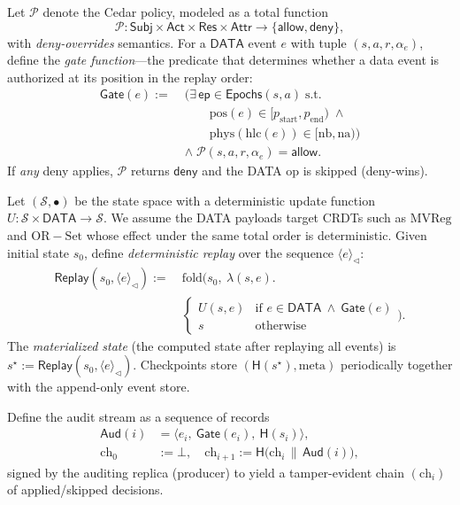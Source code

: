 \documentclass[10pt,journal,compsoc]{IEEEtran}
\begin{document}
Let $\mathcal{P}$ denote the Cedar policy, modeled as a total function
\[
  \mathcal{P} : \mathsf{Subj}\times\mathsf{Act}\times\mathsf{Res}\times\mathsf{Attr}\to\{\mathsf{allow},\mathsf{deny}\},
\]
with \emph{deny-overrides} semantics.
For a $\mathsf{DATA}$ event $e$ with tuple $(s,a,r,\alpha_e)$, define the \emph{gate function}---the predicate that determines whether a data event is authorized at its position in the replay order:
\[
\begin{aligned}
\mathsf{Gate}(e) :=\;&
\Big(
    \exists\, \mathsf{ep} \in \mathsf{Epochs}(s,a)
    \;\text{s.t.}\; \\
&\qquad
    \mathrm{pos}(e) \in [p_{\mathrm{start}}, p_{\mathrm{end}})
    \;\wedge \\
&\qquad
    \mathrm{phys}(\mathrm{hlc}(e))
    \in [\mathrm{nb}, \mathrm{na})
\Big) \\
&\wedge\;
\mathcal{P}(s,a,r,\alpha_e) = \mathsf{allow}.
\end{aligned}
\]
If \emph{any} deny applies, $\mathcal{P}$ returns $\mathsf{deny}$ and the DATA op is skipped (deny-wins).



Let $(\mathcal{S},\bullet)$ be the state space with a deterministic update function
$U:\mathcal{S}\times\mathsf{DATA}\to\mathcal{S}$.
We assume the DATA payloads target CRDTs such as $\mathrm{MVReg}$ and $\mathrm{OR\!-\!Set}$ whose effect under the same total order is deterministic.
Given initial state $s_0$, define \emph{deterministic replay} over the sequence $\langle e\rangle_{\triangleleft}$:
\[
\begin{aligned}
\mathsf{Replay}(s_0, \langle e\rangle_{\triangleleft}) :=\ &
\mathrm{fold}\Big(s_0,\ \lambda(s,e).\\
& \begin{cases}
  U(s,e) & \text{if } e\in\mathsf{DATA}\ \land\ \mathsf{Gate}(e)\\
  s      & \text{otherwise}
  \end{cases}\Big).
\end{aligned}
\]
The \emph{materialized state} (the computed state after replaying all events) is $s^\star := \mathsf{Replay}(s_0,\langle e\rangle_{\triangleleft})$.
Checkpoints store $(\mathsf{H}(s^\star),\mathrm{meta})$ periodically together with the append-only event store.


Define the audit stream as a sequence of records
\[
\begin{aligned}
\mathsf{Aud}(i) &= \big\langle e_i,\ \mathsf{Gate}(e_i),\ \mathsf{H}(s_i)\big\rangle,\\
\mathrm{ch}_0 &:= \bot,\quad
\mathrm{ch}_{i+1} := \mathsf{H}\!\big(\mathrm{ch}_i \,\|\, \mathsf{Aud}(i)\big),
\end{aligned}
\]
signed by the auditing replica (producer) to yield a tamper-evident chain $(\mathrm{ch}_i)$ of applied/skipped decisions.
\end{document}

